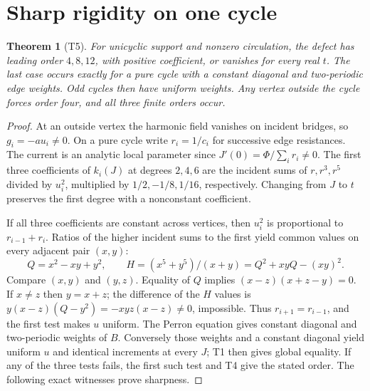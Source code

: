 \documentclass[11pt]{article}
\newtheorem{theorem}{Theorem}
\begin{document}
\section{Sharp rigidity on one cycle}
\begin{theorem}[T5]
For unicyclic support and nonzero circulation, the defect has leading
order \(4,8,12\), with positive coefficient, or vanishes for every real
\(t\). The last case occurs exactly for a pure cycle with a constant
diagonal and two-periodic edge weights. Odd cycles then have uniform
weights. Any vertex outside the cycle forces order four, and all three
finite orders occur.
\end{theorem}
\begin{proof}
At an outside vertex the harmonic field vanishes on incident bridges,
so \(g_i=-au_i\ne0\). On a pure cycle write \(r_i=1/c_i\) for successive
edge resistances. The current is an analytic local parameter since
\(J'(0)=\Phi/\sum_i r_i\ne0\). The first three coefficients of
\(k_i(J)\) at degrees \(2,4,6\) are the incident sums of \(r,r^3,r^5\)
divided by \(u_i^2\), multiplied by \(1/2,-1/8,1/16\), respectively.
Changing from \(J\) to \(t\) preserves the first degree with a
nonconstant coefficient.

If all three coefficients are constant across vertices, then \(u_i^2\)
is proportional to \(r_{i-1}+r_i\). Ratios of the higher incident sums
to the first yield common values on every adjacent pair \((x,y)\):
\[
 Q=x^2-xy+y^2,\qquad H=(x^5+y^5)/(x+y)=Q^2+xyQ-(xy)^2.
\]
Compare \((x,y)\) and \((y,z)\). Equality of \(Q\) implies
\((x-z)(x+z-y)=0\). If \(x\ne z\) then \(y=x+z\); the difference of
the \(H\) values is \(y(x-z)(Q-y^2)=-xyz(x-z)\ne0\), impossible.
Thus \(r_{i+1}=r_{i-1}\), and the first test makes \(u\) uniform.
The Perron equation gives constant diagonal and two-periodic weights
of \(B\). Conversely those weights and a constant diagonal yield
uniform \(u\) and identical increments at every \(J\); T1 then gives
global equality. If any of the three tests fails, the first such test
and T4 give the stated order. The following exact witnesses prove sharpness.
\end{proof}
\end{document}
